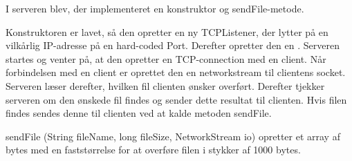 I serveren blev, der implementeret en konstruktor og sendFile-metode.

Konstruktoren er lavet, så den opretter en ny TCPListener, der lytter på en vilkårlig IP-adresse på en hard-coded Port.
Derefter opretter den en . Serveren startes og venter på, at den opretter en TCP-connection med en client.
Når forbindelsen med en client er oprettet den en networkstream til clientens socket. Serveren læser derefter, hvilken fil clienten ønsker overført. 
Derefter tjekker serveren om den ønskede fil findes og sender dette resultat til clienten.
Hvis filen findes sendes denne til clienten ved at kalde metoden sendFile.

sendFile (String fileName, long fileSize, NetworkStream io) opretter et array af bytes med en faststørrelse for at overføre filen i stykker af 1000 bytes. 